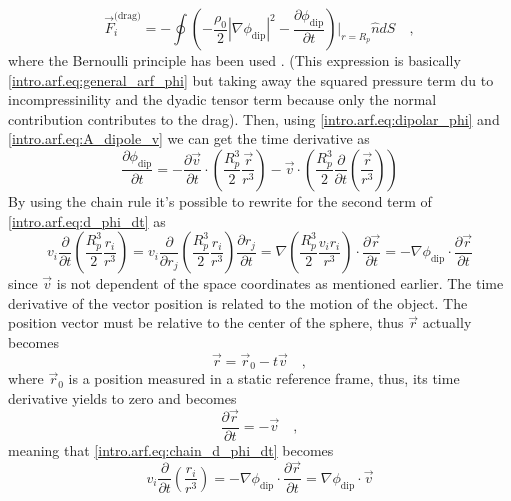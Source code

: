 \begin{equation}\label{intro.arf.eq:drag_F}
     \vec F_{i}^{\text{(drag)}} = - \oint \left(-\frac{\rho_0}{2}|\nabla\phi_{\text{dip}}|^2-\frac{\partial\phi_{\text{dip}}}{\partial t}\right)\bigg|_{r=R_p}\hat n dS \quad,
\end{equation}
where the Bernoulli principle has been used \cite{Kundu}. (This expression is basically \eqref{intro.arf.eq:general_arf_phi} but taking away the squared pressure term du to incompressinility and the dyadic tensor term because only the normal contribution contributes to the drag). Then, using \eqref{intro.arf.eq:dipolar_phi} and \eqref{intro.arf.eq:A_dipole_v} we can get the time derivative as
\begin{equation}\label{intro.arf.eq:dphi_dt_first}
    \frac{\partial\phi_{\text{dip}}}{\partial t} = -\frac{\partial\vec v}{\partial t}\cdot\left(\frac{R_p^3}{2}\frac{\vec r}{r^3}\right) - \vec v\cdot\left(\frac{R_p^3}{2}\frac{\partial}{\partial t}\left(\frac{\vec r}{r^3}\right)\right)
\end{equation}
By using the chain rule it's possible to rewrite for the second term of \eqref{intro.arf.eq:d_phi_dt} as
\begin{equation}\label{intro.arf.eq:chain_d_phi_dt}
    v_i\frac{\partial}{\partial t}\left(\frac{R_p^3}{2}\frac{r_i}{r^3}\right) = v_i\frac{\partial}{\partial r_j}\left(\frac{R_p^3}{2}\frac{r_i}{r^3}\right)\frac{\partial r_j}{\partial t} = \nabla\left(\frac{R_p^3}{2}\frac{v_ir_i}{r^3}\right)\cdot\frac{\partial\vec r}{\partial t} = -\nabla\phi_{\text{dip}}\cdot\frac{\partial\vec r}{\partial t}
\end{equation}
since $\vec v$ is not dependent of the space coordinates as mentioned earlier. The time derivative of the vector position is related to the motion of the object. The position vector must be relative to the center of the sphere, thus $\vec r$ actually becomes
\begin{equation}\label{intro.arf.eq:dr_dt}
    \vec r = \vec r_0 - t\vec v\quad,
\end{equation}
where $\vec r_0$ is a position measured in a static reference frame, thus, its time derivative yields to zero and \label{intro.arf.eq:dr_dt} becomes
\begin{equation}
    \frac{\partial\vec r}{\partial t} = -\vec v\quad,
\end{equation}
meaning that \eqref{intro.arf.eq:chain_d_phi_dt} becomes
\begin{equation}
    v_i\frac{\partial}{\partial t}\left(\frac{r_i}{r^3}\right) = -\nabla\phi_{\text{dip}}\cdot\frac{\partial\vec r}{\partial t} = \nabla\phi_{\text{dip}}\cdot\vec v
\end{equation}
